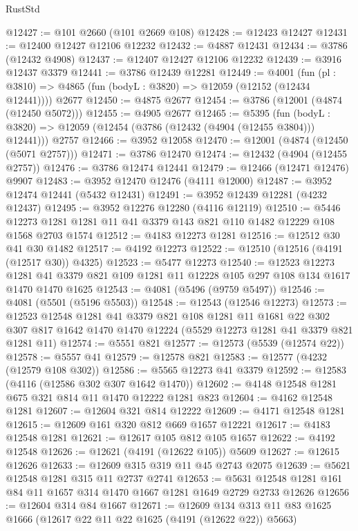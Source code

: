 \begin{lexlean}{RustStd}
\begin{coremodule}
@12427 := @101 @2660 (@101 @2669 @108)
@12428 := @12423 @12427
@12431 := @12400 @12427 @12106 @12232
@12432 := @4887 @12431
@12434 := @3786 (@12432 @4908)
@12437 := @12407 @12427 @12106 @12232
@12439 := @3916 @12437 @3379
@12441 := @3786 @12439 @12281
@12449 := @4001
    (fun (pl : @3810) => @4865 (fun (bodyL : @3820) => @12059 (@12152 (@12434 @12441))))
    @2677
@12450 := @4875 @2677
@12454 := @3786 (@12001 (@4874 (@12450 @5072)))
@12455 := @4905 @2677
@12465 := @5395
    (fun (bodyL : @3820) => @12059 (@12454 (@3786 (@12432 (@4904 (@12455 @3804))) @12441)))
    @2757
@12466 := @3952 @12058
@12470 := @12001 (@4874 (@12450 (@5071 @2757)))
@12471 := @3786 @12470
@12474 := @12432 (@4904 (@12455 @2757))
@12476 := @3786 @12474 @12441
@12479 := @12466 (@12471 @12476) @9907
@12483 := @3952 @12470 @12476 (@4111 @12000)
@12487 := @3952 @12474 @12441 (@5432 @12431)
@12491 := @3952 @12439 @12281 (@4232 @12437)
@12495 := @3952 @12276 @12280 (@4116 @12119)
@12510 := @5446 @12273 @1281 @1281 @11 @41 @3379 @143 @821 @110 @1482 @12229 @108 @1568 @2703 @1574
@12512 := @4183 @12273 @1281
@12516 := @12512 @30 @41 @30 @1482
@12517 := @4192 @12273
@12522 := @12510 (@12516 (@4191 (@12517 @30)) @4325)
@12523 := @5477 @12273
@12540 := @12523
    @12273
    @1281
    @41
    @3379
    @821
    @109
    @1281
    @11
    @12228
    @105
    @297
    @108
    @134
    @1617
    @1470
    @1470
    @1625
@12543 := @4081 (@5496 (@9759 @5497))
@12546 := @4081 (@5501 (@5196 @5503))
@12548 := @12543 (@12546 @12273)
@12573 := @12523
    @12548
    @1281
    @41
    @3379
    @821
    @108
    @1281
    @11
    @1681
    @22
    @302
    @307
    @817
    @1642
    @1470
    @1470
    @12224
    (@5529 @12273 @1281 @41 @3379 @821 @1281 @11)
@12574 := @5551 @821
@12577 := @12573 (@5539 (@12574 @22))
@12578 := @5557 @41
@12579 := @12578 @821
@12583 := @12577 (@4232 (@12579 @108 @302))
@12586 := @5565 @12273 @41 @3379
@12592 := @12583 (@4116 (@12586 @302 @307 @1642 @1470))
@12602 := @4148 @12548 @1281 @675 @321 @814 @11 @1470 @12222 @1281 @823
@12604 := @4162 @12548 @1281
@12607 := @12604 @321 @814 @12222
@12609 := @4171 @12548 @1281
@12615 := @12609 @161 @320 @812 @669 @1657 @12221
@12617 := @4183 @12548 @1281
@12621 := @12617 @105 @812 @105 @1657
@12622 := @4192 @12548
@12626 := @12621 (@4191 (@12622 @105)) @5609
@12627 := @12615 @12626
@12633 := @12609 @315 @319 @11 @45 @2743 @2075
@12639 := @5621 @12548 @1281 @315 @11 @2737 @2741
@12653 := @5631 @12548 @1281 @161 @84 @11 @1657 @314 @1470 @1667 @1281 @1649 @2729 @2733 @12626
@12656 := @12604 @314 @84 @1667
@12671 := @12609 @134 @313 @11 @83 @1625 @1666 (@12617 @22 @11 @22 @1625 (@4191 (@12622 @22)) @5663)

\end{coremodule}
\end{lexlean}
